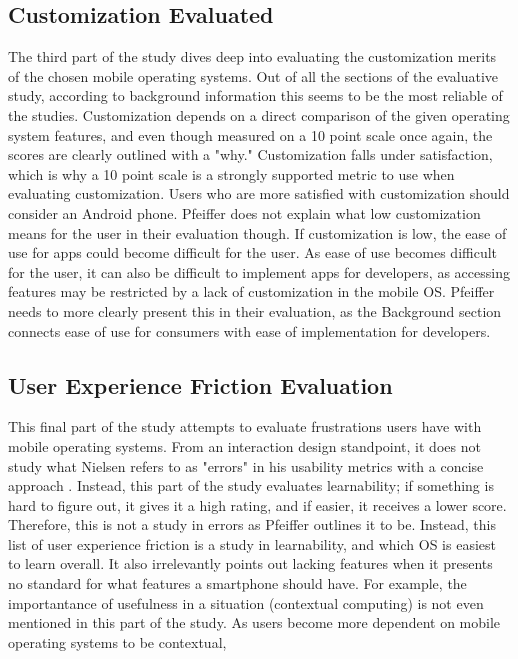 \documentclass[11pt]{article}
\begin{document}
\subsection{Customization Evaluated}
The third part of the study dives deep into evaluating the customization merits of the chosen mobile operating systems. Out of all the sections of the evaluative study, according to background information this seems to be the most reliable of the studies. Customization depends on a direct comparison of the given operating system features, and even though measured on a 10 point scale once again, the scores are clearly outlined with a "why." Customization falls under satisfaction, which is why a 10 point scale is a strongly supported metric to use when evaluating customization. Users who are more satisfied with customization should consider an Android phone. Pfeiffer does not explain what low customization means for the user in their evaluation though. If customization is low, the ease of use for apps could become difficult for the user. As ease of use becomes difficult for the user, it can also be difficult to implement apps for developers, as accessing features may be restricted by a lack of customization in the mobile OS. Pfeiffer needs to more clearly present this in their evaluation, as the Background section connects ease of use for consumers with ease of implementation for developers.
\subsection{User Experience Friction Evaluation}
This final part of the study attempts to evaluate frustrations users have with mobile operating systems. From an interaction design standpoint, it does not study what Nielsen refers to as "errors" in his usability metrics with a concise approach \cite{Nielsen}. Instead, this part of the study evaluates learnability; if something is hard to figure out, it gives it a high rating, and if easier, it receives a lower score. Therefore, this is not a study in errors as Pfeiffer outlines it to be. Instead, this list of user experience friction is a study in learnability, and which OS is easiest to learn overall. It also irrelevantly points out lacking features when it presents no standard for what features a smartphone should have. For example, the importantance of usefulness in a situation (contextual computing) is not even mentioned in this part of the study. As users become more dependent on mobile operating systems to be contextual, 
\end{document}
